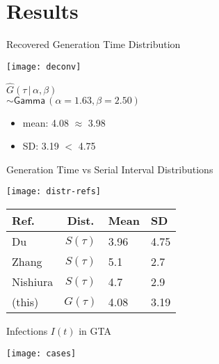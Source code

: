 \documentclass[aspectratio=169,professionalfonts]{beamer}
\begin{document}
\section{Results}
\begin{frame}{Recovered Generation Time Distribution}
  \begin{minipage}{0.65\linewidth}
    \texttt{[image: deconv]}
  \end{minipage}\hfill%
  \begin{minipage}{0.33\linewidth}
    \pause
    $\hat{G}(\tau\,|\,\alpha,\beta)$\\
    $\sim \mathsf{Gamma}\,(\alpha=1.63,\beta=2.50)$
    \vspace{1em}
    \begin{itemize}
      \item mean:  4.08 $\approx$ 3.98
      \item SD:    3.19 $<$ 4.75
    \end{itemize}
  \end{minipage}%
\end{frame}
\begin{frame}{Generation Time vs Serial Interval Distributions}
    \begin{minipage}{0.65\linewidth}
    \texttt{[image: distr-refs]}
  \end{minipage}\hfill%
  \begin{minipage}{0.33\linewidth}
    \setlength{\tabcolsep}{3pt}
    \begin{tabular}{lcll}
      \toprule
      Ref.     & Dist. & Mean & SD \\
      \midrule
      Du       & $S(\tau)$ & 3.96 & 4.75 \\
      Zhang    & $S(\tau)$ & 5.1 & 2.7 \\
      Nishiura & $S(\tau)$ & 4.7 & 2.9 \\
      (this)   & $G(\tau)$ & 4.08 & 3.19 \\
      \bottomrule
    \end{tabular}
  \end{minipage}
\end{frame}
\begin{frame}{\covid Infections $I(t)$ in GTA}
  \begin{minipage}{0.65\linewidth}
    \texttt{[image: cases]}
  \end{minipage}\hfill%
  \begin{minipage}{0.33\linewidth}
    
  \end{minipage}
\end{frame}
\end{document}
